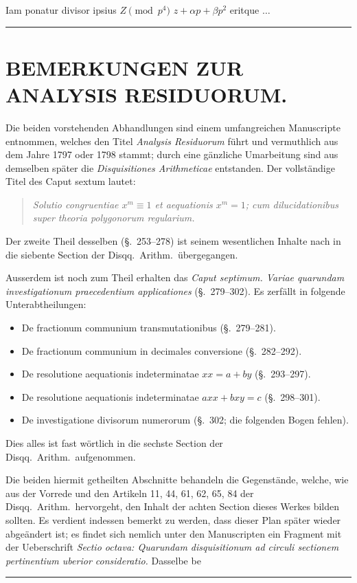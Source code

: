 \documentclass[12pt,a4paper]{article}
\newcommand{\Sec}{\S}
\begin{document}
Iam ponatur divisor ipsius $Z\pmod{p^4}$ $z+\alpha p+\beta p^2$ eritque $\ldots$

\vspace{1em}
\noindent\rule{\textwidth}{0.5pt}

\section*{BEMERKUNGEN ZUR ANALYSIS RESIDUORUM.}

Die beiden vorstehenden Abhandlungen sind einem umfangreichen Manuscripte entnommen, welches den Titel \textit{Analysis Residuorum} f\"{u}hrt und vermuthlich aus dem Jahre 1797 oder 1798 stammt; durch eine g\"{a}nzliche Umarbeitung sind aus demselben sp\"{a}ter die \textit{Disquisitiones Arithmeticae} entstanden. Der vollst\"{a}ndige Titel des Caput sextum lautet:

\begin{quote}
\textit{Solutio congruentiae $x^m\equiv 1$ et aequationis $x^m=1$; cum dilucidationibus super theoria polygonorum regularium.}
\end{quote}

Der zweite Theil desselben (\Sec.~253--278) ist seinem wesentlichen Inhalte nach in die siebente Section der Disqq.~Arithm.~\"{u}bergegangen.

Ausserdem ist noch zum Theil erhalten das \textit{Caput septimum. Variae quarundam investigationum praecedentium applicationes} (\Sec.~279--302). Es zerf\"{a}llt in folgende Unterabtheilungen:
\begin{itemize}[noitemsep]
\item De fractionum communium transmutationibus (\Sec.~279--281).
\item De fractionum communium in decimales conversione (\Sec.~282--292).
\item De resolutione aequationis indeterminatae $xx=a+by$ (\Sec.~293--297).
\item De resolutione aequationis indeterminatae $axx+bxy=c$ (\Sec.~298--301).
\item De investigatione divisorum numerorum (\Sec.~302; die folgenden Bogen fehlen).
\end{itemize}
Dies alles ist fast w\"{o}rtlich in die sechste Section der Disqq.~Arithm.~aufgenommen.

Die beiden hiermit getheilten Abschnitte behandeln die Gegenst\"{a}nde, welche, wie aus der Vorrede und den Artikeln 11, 44, 61, 62, 65, 84 der Disqq.~Arithm.~hervorgeht, den Inhalt der achten Section dieses Werkes bilden sollten. Es verdient indessen bemerkt zu werden, dass dieser Plan sp\"{a}ter wieder abge\"{a}ndert ist; es findet sich nemlich unter den Manuscripten ein Fragment mit der Ueberschrift \textit{Sectio octava: Quarundam disquisitionum ad circuli sectionem pertinentium uberior consideratio.} Dasselbe be\textendash

\vfill
\begin{center}
\rule{0.5\textwidth}{0.4pt}
\end{center}
\end{document}
